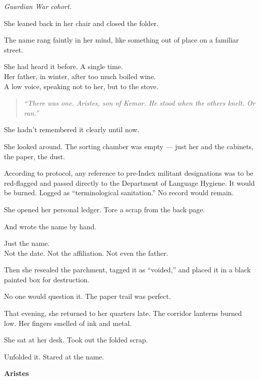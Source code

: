 \documentclass[12pt]{article}
\begin{document}
\textit{Guardian War cohort.}

\vspace{1em}

She leaned back in her chair and closed the folder.

The name rang faintly in her mind, like something out of place on a familiar street.

She had heard it before. A single time.\\
Her father, in winter, after too much boiled wine.\\
A low voice, speaking not to her, but to the stove.

\begin{quote}
\textit{“There was one. Aristes, son of Kemor. He stood when the others knelt. Or ran.”}
\end{quote}

She hadn’t remembered it clearly until now.

She looked around. The sorting chamber was empty --- just her and the cabinets, the paper, the dust.

\vspace{1em}

According to protocol, any reference to pre-Index militant designations was to be red-flagged and passed directly to the Department of Language Hygiene. It would be burned. Logged as “terminological sanitation.” No record would remain.

She opened her personal ledger. Tore a scrap from the back page.

And wrote the name by hand.

Just the name.\\
Not the date. Not the affiliation. Not even the father.

Then she resealed the parchment, tagged it as “voided,” and placed it in a black painted box for destruction.

No one would question it. The paper trail was perfect.

\vspace{1em}

That evening, she returned to her quarters late. The corridor lanterns burned low. Her fingers smelled of ink and metal.

She sat at her desk. Took out the folded scrap.

Unfolded it. Stared at the name.

\begin{center}
\textbf{Aristes}
\end{center}
\end{document}
